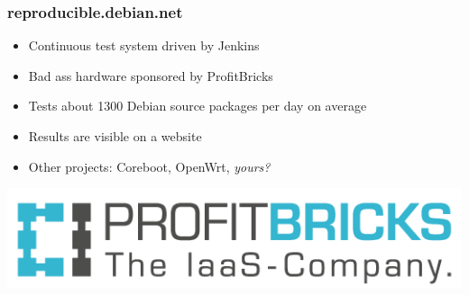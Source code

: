\documentclass[14pt,aspectratio=169]{beamer}
\begin{document}
\begin{frame}
 \frametitle{reproducible.debian.net}

 \begin{itemize}
  \item Continuous test system driven by Jenkins
  \item Bad ass hardware sponsored by ProfitBricks
  \item Tests about 1300 Debian source packages per day on average
  \item Results are visible on a website
  \item Other projects: Coreboot, OpenWrt, \textit{yours?}
 \end{itemize}
 \vfill
 \begin{center}
 \includegraphics[height=0.15\paperheight]{images/profitbricks_logo.png}
 \end{center}
\end{frame}
\end{document}
